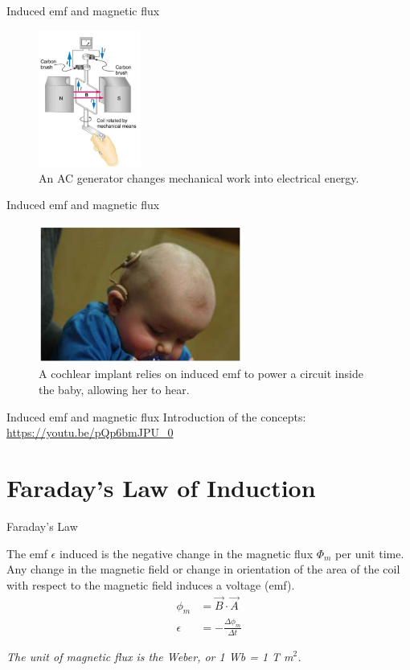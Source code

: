 \documentclass{beamer}
\begin{document}
\begin{frame}{Induced emf and magnetic flux}
\begin{figure}
\centering
\includegraphics[width=0.3\textwidth]{figures/motorz.png}
\caption{\label{fig:motorz} An AC generator changes mechanical work into electrical energy.}
\end{figure}
\end{frame}

\begin{frame}{Induced emf and magnetic flux}
\begin{figure}
\centering
\includegraphics[width=0.6\textwidth]{figures/baby.png}
\caption{\label{fig:baby} A cochlear implant relies on induced emf to power a circuit inside the baby, allowing her to hear.}
\end{figure}
\end{frame}

\begin{frame}{Induced emf and magnetic flux}
Introduction of the concepts:
\url{https://youtu.be/pQp6bmJPU_0}
\end{frame}

\section{Faraday's Law of Induction}

\begin{frame}{Faraday's Law}
\begin{tcolorbox}[colback=white,colframe=black!40!black,title=Faraday's Law]
\alert{The emf $\epsilon$ induced is the negative change in the magnetic flux $\Phi_m$ per unit time. Any change in the magnetic field
or change in orientation of the area of the coil with respect to the magnetic field induces a voltage (emf).
\begin{align}
\phi_m &= \vec{B} \cdot \vec{A} \\
\epsilon &= - \frac{\Delta\phi_m}{\Delta t}
\label{eq:farad}
\end{align}}
\end{tcolorbox}
\textit{The unit of magnetic flux is the Weber, or 1 Wb = 1 T m$^2$.}
\end{frame}
\end{document}
